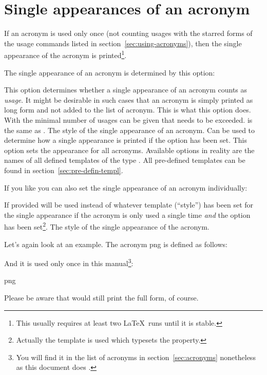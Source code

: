 \documentclass{acro-manual}
\begin{document}
\section{Single appearances of an acronym}\label{sec:single-appe-an}
If an acronym is used only once (not counting usages with the starred forms of
the usage commands listed in section~\vref{sec:using-acronyms}), then the
single appearance of the acronym is printed\footnote{This usually requires at
  least two \LaTeX\ runs until it is stable.}.

The single appearance of an acronym is determined by this option:
\begin{options}
    This option determines whether a single appearance of an acronym counts as
    \emph{usage}. It might be desirable in such cases that an acronym is
    simply printed as long form and not added to the list of acronym.  This is
    what this option does.  With  the minimal number of usages
    can be given that needs to be exceeded.   is the same as
    .
    The style of the single appearance of an acronym.  Can be used to
    determine how a single appearance is printed if the option 
    has been set. This option sets the appearance for all acronyms.
    Available options in reality are the names of all defined templates of the
    type . All pre-defined templates can be found in
    section~\vref{sec:pre-defin-templ}.
\end{options}

If you like you can also set the single appearance of an acronym individually:
\begin{properties}
  \Default
    If provided  will be used instead of whatever template
    (\enquote{style}) has been set for the single appearance if the acronym is
    only used a single time \emph{and} the option  has been
    set\footnote{Actually the template  is used which
      typesets the  property.}.
  \Default
    The style of the single appearance of the acronym.
\end{properties}
Let's again look at an example. The acronym \acs*{png} is defined as follows:
\begin{sourcecode}
\end{sourcecode}
And it is used only once in this manual\footnote{You will find it in the list
  of acronyms in section~\ref{sec:acronyms} nonetheless as this document does
  .}:
\begin{example}
  \ac{png}
\end{example}  
Please be aware that  would still print the full form, of course.
\end{document}
